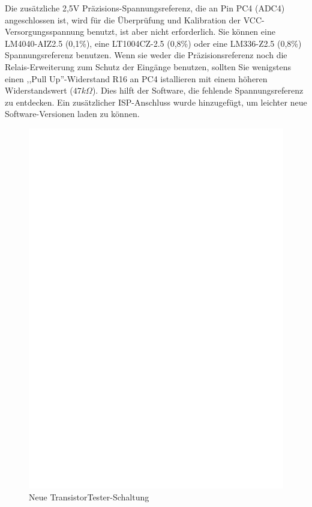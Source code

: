 Die zusätzliche 2,5V Präzisions-Spannungsreferenz, die an Pin PC4 (ADC4) angeschlossen ist,
wird für die Überprüfung und Kalibration der VCC-Versorgungsspannung benutzt, ist aber nicht
erforderlich.
Sie können eine LM4040-AIZ2.5 (0,1\%),
eine LT1004CZ-2.5 (0,8\%) oder eine LM336-Z2.5 (0,8\%) Spannungsreferenz benutzen.
Wenn sie weder die Präzisionsreferenz noch die Relais-Erweiterung zum Schutz der Eingänge benutzen,
sollten Sie wenigstens einen ,,Pull Up''-Widerstand R16 an PC4 istallieren mit einem
höheren Widerstandswert (\(47k\Omega\)).
Dies hilft der Software, die fehlende Spannungsreferenz zu entdecken.
Ein zusätzlicher ISP-Anschluss wurde hinzugefügt, um leichter neue Software-Versionen
laden zu können.

\begin{figure}[H]
\centering
\includegraphics[width=18cm]{../FIG/ttester.eps}
\caption{Neue TransistorTester-Schaltung}
\label{fig:ttester}
\end{figure}

